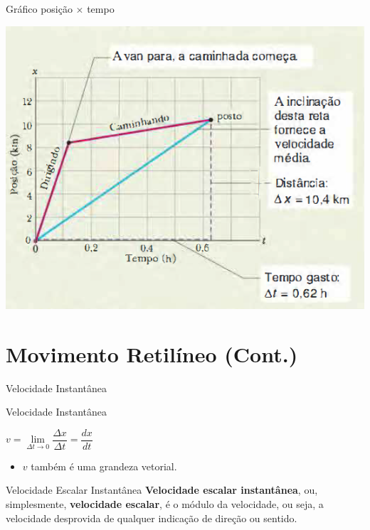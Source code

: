 \documentclass[xcolor=dvipsnames,table]{beamer}
\begin{document}
\begin{frame}{Gráfico posição $\times$ tempo}
\begin{center}
\includegraphics[scale=0.5]{images/fig2-5}
\end{center}
\end{frame}
	
	\section{Movimento Retilíneo (Cont.)}
	\begin{frame}{Velocidade Instantânea}
		\begin{block}{Velocidade Instantânea}
			\begin{center}
				$v = \underset{\Delta t\rightarrow 0}{\lim} \dfrac{\Delta x}{\Delta t} = \dfrac{dx}{dt}$
			\end{center} \pause
			\begin{itemize}
				\item $v$ também é uma grandeza vetorial.
			\end{itemize}
		\end{block} \pause
		\begin{block}{Velocidade Escalar Instantânea}
			{\bf Velocidade escalar instantânea}, ou, simplesmente, {\bf velocidade escalar}, é o módulo da velocidade, ou seja, a velocidade desprovida de qualquer indicação de direção ou sentido.
		\end{block}
	\end{frame}
\end{document}
